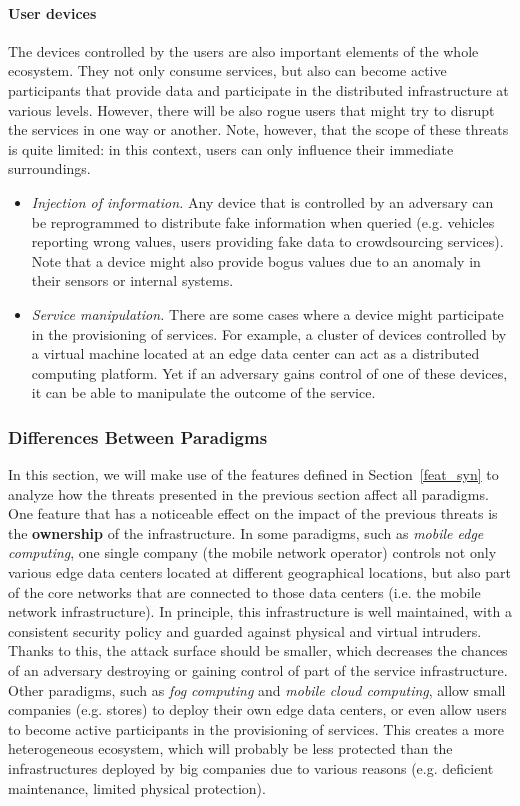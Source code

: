 \documentclass[twocolumn,preprint,3p]{elsarticle}
\begin{document}
\paragraph{User devices} The devices controlled by the users are also important elements of the whole ecosystem. They not only consume services, but also can become active participants that provide data and participate in the distributed infrastructure at various levels. However, there will be also rogue users that might try to disrupt the services in one way or another. Note, however, that the scope of these threats is quite limited: in this context, users can only influence their immediate surroundings.
    \begin{itemize}
      \item \textit{Injection of information.} Any device that is controlled by an adversary can be reprogrammed to distribute fake information when queried (e.g. vehicles reporting wrong values, users providing fake data to crowdsourcing services). Note that a device might also provide bogus values due to an anomaly in their sensors or internal systems.
      \item \textit{Service manipulation.} There are some cases where a device might participate in the provisioning of services. For example, a cluster of devices controlled by a virtual machine located at an edge data center can act as a distributed computing platform. Yet if an adversary gains control of one of these devices, it can be able to manipulate the outcome of the service.
    \end{itemize}

\subsubsection{Differences Between Paradigms}
\label{sec_thre::land::particularities}

In this section, we will make use of the features defined in Section~\ref{feat_syn} to analyze how the threats presented in the previous section affect all paradigms. One feature that has a noticeable effect on the impact of the previous threats is the \textbf{ownership} of the infrastructure. In some paradigms, such as \textit{mobile edge computing}, one single company (the mobile network operator) controls not only various edge data centers located at different geographical locations, but also part of the core networks that are connected to those data centers (i.e. the mobile network infrastructure). In principle, this infrastructure is well maintained, with a consistent security policy and guarded against physical and virtual intruders. Thanks to this, the attack surface should be smaller, which decreases the chances of an adversary destroying or gaining control of part of the service infrastructure. Other paradigms, such as \textit{fog computing} and \textit{mobile cloud computing}, allow small companies (e.g. stores) to deploy their own edge data centers, or even allow users to become active participants in the provisioning of services. This creates a more heterogeneous ecosystem, which will probably be less protected than the infrastructures deployed by big companies due to various reasons (e.g. deficient maintenance, limited physical protection).
\end{document}
